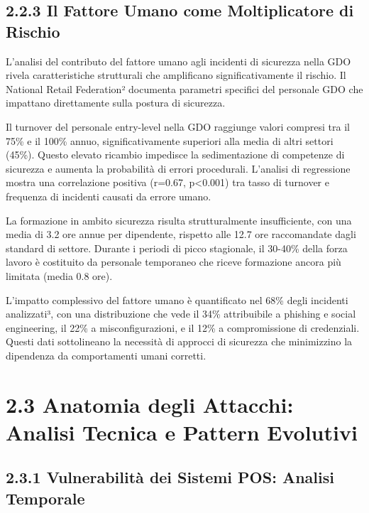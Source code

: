 \documentclass[12pt,a4paper,oneside]{book}
\numberwithin{figure}{chapter} %
\numberwithin{table}{chapter}  %
\begin{document}
\subsection{2.2.3 Il Fattore Umano come Moltiplicatore di
Rischio}\label{il-fattore-umano-come-moltiplicatore-di-rischio}

L'analisi del contributo del fattore umano agli incidenti di sicurezza
nella GDO rivela caratteristiche strutturali che amplificano
significativamente il rischio. Il National Retail Federation² documenta
parametri specifici del personale GDO che impattano direttamente sulla
postura di sicurezza.

Il turnover del personale entry-level nella GDO raggiunge valori
compresi tra il 75\% e il 100\% annuo, significativamente superiori alla
media di altri settori (45\%). Questo elevato ricambio impedisce la
sedimentazione di competenze di sicurezza e aumenta la probabilità di
errori procedurali. L'analisi di regressione mostra una correlazione
positiva (r=0.67, p\textless0.001) tra tasso di turnover e frequenza di
incidenti causati da errore umano.

La formazione in ambito sicurezza risulta strutturalmente insufficiente,
con una media di 3.2 ore annue per dipendente, rispetto alle 12.7 ore
raccomandate dagli standard di settore. Durante i periodi di picco
stagionale, il 30-40\% della forza lavoro è costituito da personale
temporaneo che riceve formazione ancora più limitata (media 0.8 ore).

L'impatto complessivo del fattore umano è quantificato nel 68\% degli
incidenti analizzati³, con una distribuzione che vede il 34\%
attribuibile a phishing e social engineering, il 22\% a
misconfigurazioni, e il 12\% a compromissione di credenziali. Questi
dati sottolineano la necessità di approcci di sicurezza che minimizzino
la dipendenza da comportamenti umani corretti.

\section{2.3 Anatomia degli Attacchi: Analisi Tecnica e Pattern
Evolutivi}\label{anatomia-degli-attacchi-analisi-tecnica-e-pattern-evolutivi}

\subsection{2.3.1 Vulnerabilità dei Sistemi POS: Analisi
Temporale}\label{vulnerabilituxe0-dei-sistemi-pos-analisi-temporale}
\end{document}
